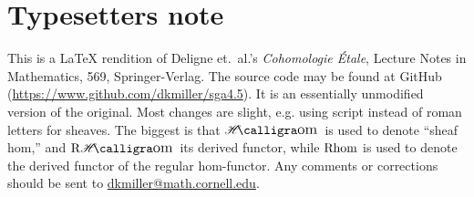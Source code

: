 
\section*{Typesetters note}

This is a \LaTeX{} rendition of Deligne et.~al.'s \emph{Cohomologie \'Etale}, Lecture 
Notes in Mathematics, 569, Springer-Verlag. The source code may be found at 
GitHub (\url{https://www.github.com/dkmiller/sga4.5}). It is an essentially 
unmodified version of the original. Most changes are slight, e.g. using 
script instead of roman letters for sheaves. The biggest is that 
$\Hom$ is used to denote ``sheaf hom,'' and $\rHom$ its derived functor, while 
$\operatorname{Rhom}$ is used to denote the derived functor of the regular hom-functor. Any 
comments or corrections should be sent to \url{dkmiller@math.cornell.edu}.